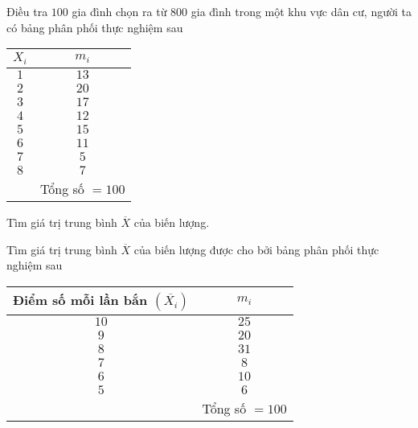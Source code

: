 \begin{vd}%
Điều tra $100$ gia đình chọn ra từ $800$ gia đình trong một khu vực dân cư, người ta có bảng phân phối thực nghiệm sau
\begin{center}
\begin{tabular}{|c|c|}
\hline 
$X_i$ & $m_i$ \\ 
\hline 
$1$ & $13$ \\ 
$2$ & $20$ \\ 
$3$ & $17$ \\ 
$4$ & $12$ \\ 
$5$ & $15$ \\ 
$6$ & $11$ \\ 
$7$ & $5$ \\ 
$8$ & $7$ \\ 
\hline 
 & Tổng số $=100$ \\ 
\hline 
\end{tabular}
\end{center}
Tìm giá trị trung bình $\overline{X}$ của biến lượng.
\end{vd}

\begin{vd}%
Tìm giá trị trung bình $\overline{X}$ của biến lượng được cho bởi bảng phân phối thực nghiệm sau
\begin{center}
\begin{tabular}{|c|c|}
\hline 
Điểm số mỗi lần bắn $(\overline{X_i})$ & $m_i$ \\ 
\hline 
$10$ & $25$ \\ 
$9$ & $20$ \\ 
$8$ & $31$ \\ 
$7$ & $8$ \\ 
$6$ & $10$ \\ 
$5$ & $6$ \\ 
\hline 
 & Tổng số $=100$ \\ 
\hline 
\end{tabular} 
\end{center}
\end{vd}

